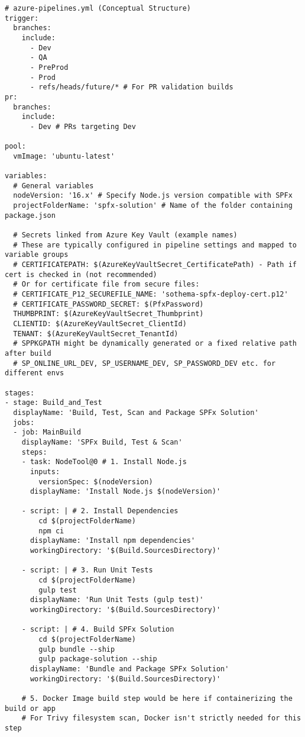 \begin{verbatim}
# azure-pipelines.yml (Conceptual Structure)
trigger:
  branches:
    include:
      - Dev
      - QA
      - PreProd
      - Prod
      - refs/heads/future/* # For PR validation builds
pr:
  branches:
    include:
      - Dev # PRs targeting Dev

pool:
  vmImage: 'ubuntu-latest'

variables:
  # General variables
  nodeVersion: '16.x' # Specify Node.js version compatible with SPFx
  projectFolderName: 'spfx-solution' # Name of the folder containing package.json

  # Secrets linked from Azure Key Vault (example names)
  # These are typically configured in pipeline settings and mapped to variable groups
  # CERTIFICATEPATH: $(AzureKeyVaultSecret_CertificatePath) - Path if cert is checked in (not recommended)
  # Or for certificate file from secure files:
  # CERTIFICATE_P12_SECUREFILE_NAME: 'sothema-spfx-deploy-cert.p12'
  # CERTIFICATE_PASSWORD_SECRET: $(PfxPassword)
  THUMBPRINT: $(AzureKeyVaultSecret_Thumbprint)
  CLIENTID: $(AzureKeyVaultSecret_ClientId)
  TENANT: $(AzureKeyVaultSecret_TenantId)
  # SPPKGPATH might be dynamically generated or a fixed relative path after build
  # SP_ONLINE_URL_DEV, SP_USERNAME_DEV, SP_PASSWORD_DEV etc. for different envs

stages:
- stage: Build_and_Test
  displayName: 'Build, Test, Scan and Package SPFx Solution'
  jobs:
  - job: MainBuild
    displayName: 'SPFx Build, Test & Scan'
    steps:
    - task: NodeTool@0 # 1. Install Node.js
      inputs:
        versionSpec: $(nodeVersion)
      displayName: 'Install Node.js $(nodeVersion)'

    - script: | # 2. Install Dependencies
        cd $(projectFolderName)
        npm ci
      displayName: 'Install npm dependencies'
      workingDirectory: '$(Build.SourcesDirectory)'

    - script: | # 3. Run Unit Tests
        cd $(projectFolderName)
        gulp test
      displayName: 'Run Unit Tests (gulp test)'
      workingDirectory: '$(Build.SourcesDirectory)'

    - script: | # 4. Build SPFx Solution
        cd $(projectFolderName)
        gulp bundle --ship
        gulp package-solution --ship
      displayName: 'Bundle and Package SPFx Solution'
      workingDirectory: '$(Build.SourcesDirectory)'

    # 5. Docker Image build step would be here if containerizing the build or app
    # For Trivy filesystem scan, Docker isn't strictly needed for this step


\end{verbatim}
